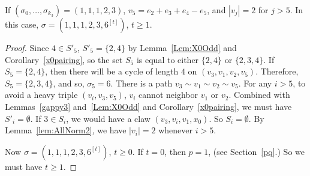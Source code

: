 \begin{prop}\label{prop:k1=1,k2=2,v2justright2}
If $(\sigma_0,\dots,\sigma_{k_3}) = (1,1,1,2,3)$, $v_5 = e_2 + e_3 + e_4 - e_5$, and $|v_j| = 2$ for $j > 5$. In this case, $\sigma = (1,1,1,2,3,6^{[t]})$, $t\ge1$.
\end{prop}
\begin{proof}
Since $4\in S'_5$, $S'_5 = \{ 2, 4\}$ by Lemma~\ref{Lem:X0Odd} and Corollary~\ref{x0pairing}, so the set $S_5$ is equal to either $\{ 2, 4\}$ or $\{ 2, 3, 4\}$. If $S_5=\{ 2, 4\}$, then there will be a cycle of length $4$ on $(v_3, v_1, v_2, v_5)$. Therefore, $S_5 = \{ 2, 3, 4\}$, and so, $\sigma_5=6$. There is a path $v_3\sim v_1\sim v_2\sim v_5$. 
For any $i>5$, to avoid a heavy triple $(v_i,v_3,v_5)$, $v_i$ cannot neighbor $v_1$ or $v_2$. Combined with Lemmas~\ref{gappy3} and~\ref{Lem:X0Odd} and Corollary~\ref{x0pairing}, we must have $S'_i=\emptyset$. If $3\in S_i$, we would have a claw $(v_3,v_i,v_1,x_0)$. So $S_i=\emptyset$. By Lemma~\ref{lem:AllNorm2}, we have $|v_i|=2$ whenever $i>5$.

Now  $\sigma = (1,1,1,2,3,6^{[t]})$, $t\ge0$. If $t=0$, then $p=1$, (see Section~\ref{pq}.) So we must have $t\ge1$.
\end{proof}


